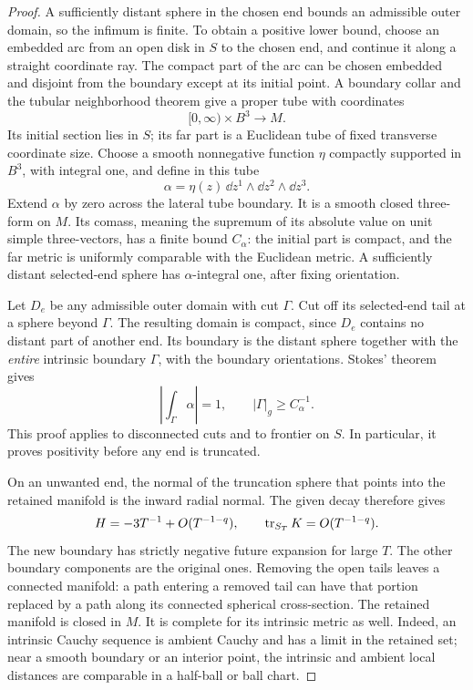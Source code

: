 \begin{proof}
A sufficiently distant sphere in the chosen end bounds an admissible
outer domain, so the infimum is finite. To obtain a positive lower bound,
choose an embedded arc from an open disk in \(S\) to the chosen end, and
continue it along a straight coordinate ray. The compact part of the arc
can be chosen embedded and disjoint from the boundary except at its
initial point. A boundary collar and the tubular neighborhood theorem
give a proper tube with coordinates
\[
 [0,\infty)\times B^3\longrightarrow M.
\]
Its initial section lies in \(S\); its far part is a Euclidean tube of
fixed transverse coordinate size. Choose a smooth nonnegative function
\(\eta\) compactly supported in \(B^3\), with integral one, and define
in this tube
\[
 \alpha=\eta(z)\,\dd z^1\wedge\dd z^2\wedge\dd z^3.
\]
Extend \(\alpha\) by zero across the lateral tube boundary. It is a
smooth closed three-form on \(M\). Its comass, meaning the supremum of
its absolute value on unit simple three-vectors, has a finite bound
\(C_\alpha\): the initial part is compact, and the far metric is
uniformly comparable with the Euclidean metric. A sufficiently distant
selected-end sphere has \(\alpha\)-integral one, after fixing orientation.

Let \(D_e\) be any admissible outer domain with cut \(\Gamma\). Cut off
its selected-end tail at a sphere beyond \(\Gamma\). The resulting
domain is compact, since \(D_e\) contains no distant part of another
end. Its boundary is the distant sphere together with the \emph{entire}
intrinsic boundary \(\Gamma\), with the boundary orientations.
Stokes' theorem gives
\[
 \left|\int_\Gamma\alpha\right|=1,
 \qquad |\Gamma|_g\ge C_\alpha^{-1}.
\]
This proof applies to disconnected cuts and to frontier on \(S\).
In particular, it proves positivity before any end is truncated.

On an unwanted end, the normal of the truncation sphere that points
into the retained manifold is the inward radial normal. The given decay
therefore gives
\[
 H=-3T^{-1}+O(T^{-1-q}),\qquad
 \operatorname{tr}_{S_T}K=O(T^{-1-q}).
\]
The new boundary has strictly negative future expansion for large
\(T\). The other boundary components are the original ones.
Removing the open tails leaves a connected manifold: a path entering a
removed tail can have that portion replaced by a path along its connected
spherical cross-section. The retained manifold is closed in \(M\).
It is complete for its intrinsic metric as well. Indeed, an intrinsic
Cauchy sequence is ambient Cauchy and has a limit in the retained set;
near a smooth boundary or an interior point, the intrinsic and ambient
local distances are comparable in a half-ball or ball chart.


\end{proof}
